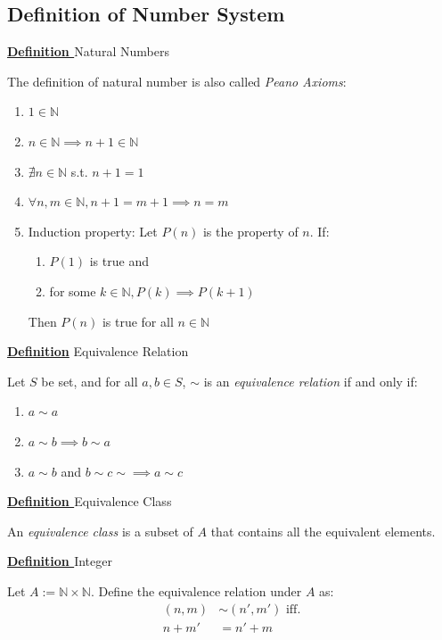\documentclass[a4paper, 12pt]{article}
\begin{document}
\subsection{Definition of Number System}
\textbf{\underline{Definition }} Natural Numbers

The definition of natural number is also called \textit{Peano Axioms}:
\begin{enumerate}
    \item $1\in \mathbb{N}$
    \item $n\in\mathbb{N} \implies n + 1\in \mathbb{N}$
    \item $\nexists n \in \mathbb{N}$ s.t. $n + 1 = 1$
    \item $\forall n,m\in \mathbb{N}, n + 1 = m + 1 \implies n = m$
    \item Induction property:
        Let $P(n)$ is the property of $n$. If:
        \begin{enumerate}
            \item $P(1)$ is true and
            \item for some $k\in\mathbb{N}, P(k)\implies P(k+1)$
        \end{enumerate}
        Then $P(n)$ is true for all $n\in\mathbb{N}$
\end{enumerate}

\textbf{\underline{Definition}} Equivalence Relation

Let $S$ be set, and for all $a,b\in S$, $\sim$ is an \textit{equivalence relation}
if and only if:
\begin{enumerate}
    \item $a\sim a$
    \item $a\sim b\implies b\sim a$
    \item $a\sim b$ and $b\sim c\sim \implies a\sim c$
\end{enumerate}

\textbf{\underline{Definition }} Equivalence Class

An \textit{equivalence class} is a subset of $A$ that contains all the equivalent
elements.

\vspace{5mm}
\textbf{\underline{Definition }} Integer

Let $A:=\mathbb{N} \times \mathbb{N}$. Define the equivalence relation under
$A$ as:
$$\begin{aligned}
    (n, m) &\sim (n', m') \textrm{ iff.}\\
    n + m' &= n' + m
\end{aligned}$$ 
\end{document}
